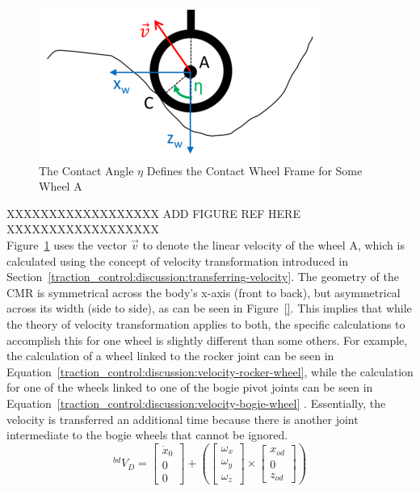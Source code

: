\begin{figure}[H]
	\centering
	\includegraphics[width=.8\textwidth]{sections/discussion/images/contact_angle.png}
	\caption{The Contact Angle $\eta$ Defines the Contact Wheel Frame for Some Wheel A \cite{tractl}}
	\label{traction_control:discussion:contact-angle}
\end{figure}

XXXXXXXXXXXXXXXXXX
ADD FIGURE REF HERE
XXXXXXXXXXXXXXXXXX \\
Figure~\ref{traction_control:discussion:contact-angle} uses the vector $\vec{v}$ to denote the linear velocity of the wheel A, which is calculated using the concept of velocity transformation introduced in Section~\ref{traction_control:discussion:transferring-velocity}. The geometry of the \ac{CMR} is symmetrical across the body's x-axis (front to back), but asymmetrical across its width (side to side), as can be seen in Figure~\ref{}. This implies that while the theory of velocity transformation applies to both, the specific calculations to accomplish this for one wheel is slightly different than some others. For example, the calculation of a wheel linked to the rocker joint can be seen in Equation~\ref{traction_control:discussion:velocity-rocker-wheel}, while the calculation for one of the wheels linked to one of the bogie pivot joints can be seen in Equation~\ref{traction_control:discussion:velocity-bogie-wheel} \cite{tractl}. Essentially, the velocity is transferred an additional time because there is another joint intermediate to the bogie wheels that cannot be ignored. \\

\begin{equation}\label{traction_control:discussion:velocity-body}
	{}^{bd}V_{D} = \left[\begin{array}{c}
		\dot{x}_0 \\
		0 \\
		0
	\end{array}\right] + \left(\left[\begin{array}{c}
		\omega_{x} \\
		\omega_{y} \\
		\omega_{z}
	\end{array}\right] \times \left[\begin{array}{c}
	x_{od} \\
	0 \\
	z_{od}
	\end{array}\right]\right)
\end{equation}

